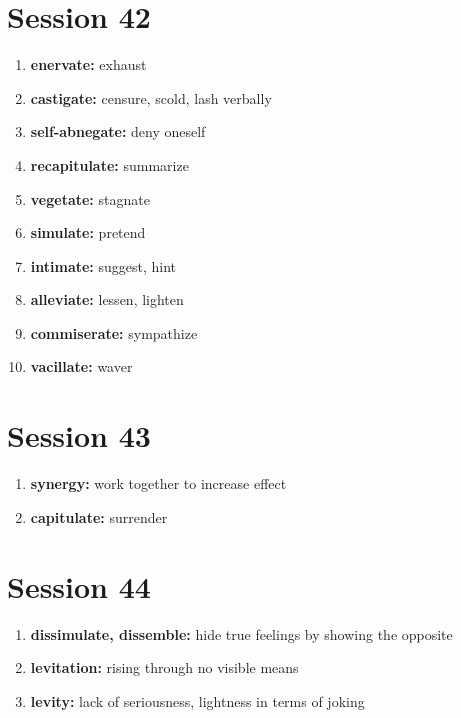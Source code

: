 \documentclass{article}
\begin{document}
\section{Session 42}
\begin{enumerate}
    \item \textbf{enervate: }{exhaust}
    \item \textbf{castigate: }{censure, scold, lash verbally}
    \item \textbf{self-abnegate: }{deny oneself}
    \item \textbf{recapitulate: }{summarize}
    \item \textbf{vegetate: }{stagnate}
    \item \textbf{simulate: }{pretend}
    \item \textbf{intimate: }{suggest, hint}
    \item \textbf{alleviate: }{lessen, lighten}
    \item \textbf{commiserate: }{sympathize}
    \item \textbf{vacillate: }{waver}
    
\end{enumerate}

\section{Session 43}
\begin{enumerate}
    \item \textbf{synergy: }{work together to increase effect}
    \item \textbf{capitulate: }{surrender}
    
\end{enumerate}

\section{Session 44}
\begin{enumerate}
    \item \textbf{dissimulate, dissemble: }{hide true feelings by showing the opposite}
    \item \textbf{levitation: }{rising through no visible means}
    \item \textbf{levity: }{lack of seriousness, lightness in terms of joking}
    
\end{enumerate}
\end{document}

